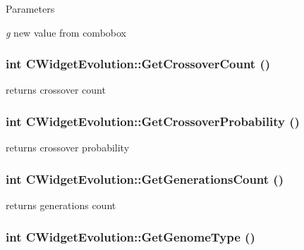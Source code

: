 \begin{DoxyParams}{Parameters}
\item[{\em g}]new value from combobox \end{DoxyParams}
\hypertarget{classCWidgetEvolution_a2e12780109a568cf644e39eb3a197dc8}{
\subsubsection[{GetCrossoverCount}]{\setlength{\rightskip}{0pt plus 5cm}int CWidgetEvolution::GetCrossoverCount ()}}
\label{classCWidgetEvolution_a2e12780109a568cf644e39eb3a197dc8}
returns crossover count \hypertarget{classCWidgetEvolution_aa56437520abf70bfabc084ff03a6741b}{
\subsubsection[{GetCrossoverProbability}]{\setlength{\rightskip}{0pt plus 5cm}int CWidgetEvolution::GetCrossoverProbability ()}}
\label{classCWidgetEvolution_aa56437520abf70bfabc084ff03a6741b}
returns crossover probability \hypertarget{classCWidgetEvolution_a011bcc0709b3086df95eec9129919fe4}{
\subsubsection[{GetGenerationsCount}]{\setlength{\rightskip}{0pt plus 5cm}int CWidgetEvolution::GetGenerationsCount ()}}
\label{classCWidgetEvolution_a011bcc0709b3086df95eec9129919fe4}
returns generations count \hypertarget{classCWidgetEvolution_a6fbf46c23f78d22d382e6ae0b02d97bd}{
\subsubsection[{GetGenomeType}]{\setlength{\rightskip}{0pt plus 5cm}int CWidgetEvolution::GetGenomeType ()}}
\label{classCWidgetEvolution_a6fbf46c23f78d22d382e6ae0b02d97bd}
